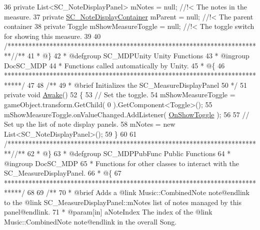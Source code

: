 \begin{DoxyCodeInclude}
36 \textcolor{comment}{}    \textcolor{keyword}{private} List<SC\_NoteDisplayPanel> mNotes = null; \textcolor{comment}{//!< The notes in the measure.}
37 \textcolor{comment}{}    \textcolor{keyword}{private} \hyperlink{class_s_c___note_display_container}{SC\_NoteDisplayContainer} mParent = null; \textcolor{comment}{//!< The parent container }
38 \textcolor{comment}{}    \textcolor{keyword}{private} Toggle mShowMeasureToggle = null; \textcolor{comment}{//!< The toggle switch for showing this measure.}
39 \textcolor{comment}{}
40     \textcolor{comment}{/*************************************************************************/}\textcolor{comment}{/** }
41 \textcolor{comment}{    * @\}}
42 \textcolor{comment}{    * @defgroup SC\_MDPUnity Unity Functions}
43 \textcolor{comment}{    * @ingroup DocSC\_MDP}
44 \textcolor{comment}{    * Functions called automatically by Unity.}
45 \textcolor{comment}{    * @\{}
46 \textcolor{comment}{    *****************************************************************************/}
47 \textcolor{comment}{}
48 \textcolor{comment}{    /**}
49 \textcolor{comment}{     * @brief Initializes the SC\_MeasureDisplayPanel}
50 \textcolor{comment}{    */}
51     \textcolor{keyword}{private} \textcolor{keywordtype}{void} \hyperlink{group___s_c___m_d_p_unity_gafe9062b7be241c5febf7b493bb6002f9}{Awake}()
52     \{
53         \textcolor{comment}{// Set the toggle.}
54         mShowMeasureToggle = gameObject.transform.GetChild( 0 ).GetComponent<Toggle>();
55         mShowMeasureToggle.onValueChanged.AddListener( \hyperlink{group___s_c___m_d_p_handlers_ga31c72fee5ddd5ae7b057b2f265341263}{OnShowToggle} );
56 
57         \textcolor{comment}{// Set up the list of note display panels.}
58         mNotes = \textcolor{keyword}{new} List<SC\_NoteDisplayPanel>();
59     \}
60 
61     \textcolor{comment}{/*************************************************************************/}\textcolor{comment}{/** }
62 \textcolor{comment}{    * @\}}
63 \textcolor{comment}{    * @defgroup SC\_MDPPubFunc Public Functions}
64 \textcolor{comment}{    * @ingroup DocSC\_MDP}
65 \textcolor{comment}{    * Functions for other classes to interact with the SC\_MeasureDisplayPanel.}
66 \textcolor{comment}{    * @\{}
67 \textcolor{comment}{    *****************************************************************************/}
68 \textcolor{comment}{}
69 \textcolor{comment}{    /**}
70 \textcolor{comment}{     * @brief Adds a @link Music::CombinedNote note@endlink to the @link SC\_MeasureDisplayPanel::mNotes
       list of notes managed by this panel@endlink. }
71 \textcolor{comment}{     * @param[in] aNoteIndex The index of the @link Music::CombinedNote note@endlink in the overall Song.}

\end{DoxyCodeInclude}

